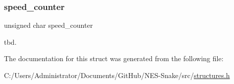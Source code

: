 \subsubsection{\texorpdfstring{speed\+\_\+counter}{speed\_counter}}
{\footnotesize\ttfamily unsigned char speed\+\_\+counter}

tbd. 

The documentation for this struct was generated from the following file\+:\begin{DoxyCompactItemize}
\item 
C\+:/\+Users/\+Administrator/\+Documents/\+Git\+Hub/\+N\+E\+S-\/\+Snake/src/\hyperlink{structures_8h}{structures.\+h}\end{DoxyCompactItemize}
